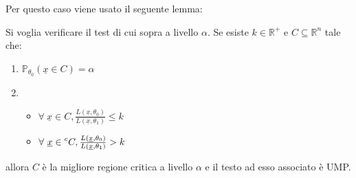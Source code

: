 \documentclass[hidelinks, 10pt]{report}
\begin{document}
Per questo caso viene usato il seguente lemma:
\begin{lem}
Si voglia verificare il test di cui sopra a livello $ \alpha $. Se esiste $ k \in \mathbb{R}^{+} $ e $ C \subseteq \mathbb{R}^{n} $ tale che:
\begin{enumerate}
\item $ \mathbb{P}_{\theta_{0}} (\underline{x} \in C) = \alpha $
\item \noindent
\begin{itemize}
\item $ \forall\ \underline{x} \in C, \frac{L(\underline{x}, \theta_{0})}{L(\underline{x}, \theta_{1})} \le k $
\item $ \forall\ \underline{x} \in \prescript{c}{}{C}, \frac{L(\underline{x}, \theta_{0})}{L(\underline{x}, \theta_{1})} > k $
\end{itemize}
\end{enumerate}
allora $ C $ \`e la migliore regione critica a livello $ \alpha $ e il testo ad esso associato \`e UMP.
\end{lem}
\end{document}
